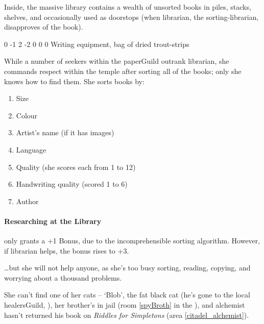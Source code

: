 \begin{multicols}{2}
Inside, the massive library contains a wealth of unsorted books in piles, stacks, shelves, and occasionally used as doorstops (when \gls{librarian}, the sorting-librarian, disapproves of the book).


{0}%
{-1}%
{{2}%
{-2}%
{0}}%
{0}%
{0}%
{}%
{Writing equipment, bag of dried trout-strips}%
{
  \setcounter{Academics}{3}
  \setcounter{Crafts}{1}
  \setcounter{Empathy}{1}
}

While a number of \glspl{seeker} within the \gls{paperGuild} outrank \gls{librarian}, she commands respect within the temple after sorting all of the books; only she knows how to find them.
She sorts books by:

\begin{multicols}{2}
\begin{enumerate}
  \item
  Size
  \item
  Colour
  \item
  Artist's name (if it has images)
  \item
  Language
  \item
  Quality (she scores each from 1 to 12)
  \item
  Handwriting quality (scored 1 to 6)
  \item
  Author
\end{enumerate}
\end{multicols}

\paragraph{Researching at the Library}
only grants a +1 Bonus, due to the incomprehensible sorting algorithm.
However, if \gls{librarian} helps, the bonus rises to +3.

\ldots but she will not help anyone, as she's too busy sorting, reading, copying, and worrying about a thousand problems.

She can't find one of her cats -- `Blob', the fat black cat (he's gone to the local \gls{healersGuild}, ),
her brother's in jail (room  \vref{spyBroth} in the ), and \gls{alchemist} hasn't returned his book on \textit{Riddles for Simpletons} (area \vref{citadel_alchemist}).
\label{paperCat}


\end{multicols}
